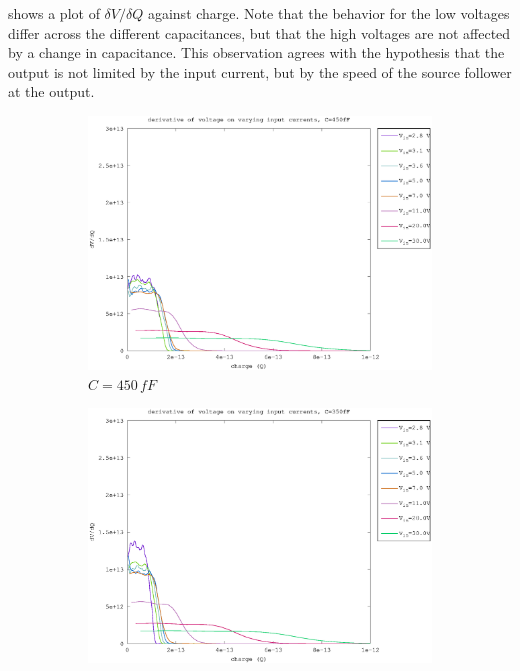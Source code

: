 \documentclass{article}
\begin{document}
 shows a plot of $\delta V/\delta Q$ against charge. Note that the behavior for the low voltages differ across the different capacitances, but that the high voltages are not affected by a change in capacitance. This observation agrees with the hypothesis that the output is not limited by the input current, but by the speed of the source follower at the output.

\begin{figure}[h]
	\centering
	\begin{subfigure}[b]{0.475\textwidth}
	    \centering
	    \includegraphics[width=\textwidth]{fig/bre_d_slope_450fF.eps}
	    \caption[Network2]%
	    {$C=450\,fF$}    
	    \label{fig:bre_d_slopes_450fF}
	\end{subfigure}
	\hfill
	\begin{subfigure}[b]{0.475\textwidth}  
	    \centering 
	    \includegraphics[width=\textwidth]{fig/bre_d_slope_350fF.eps}

\end{subfigure}
\end{figure}
\end{document}
